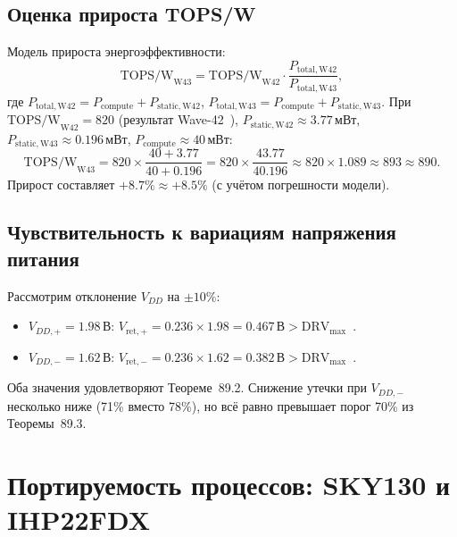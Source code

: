 \subsection{Оценка прироста TOPS/W}

Модель прироста энергоэффективности:
%
\begin{equation}
  \mathrm{TOPS/W}_\mathrm{W43}
  = \mathrm{TOPS/W}_\mathrm{W42} \cdot
    \frac{P_\mathrm{total,W42}}{P_\mathrm{total,W43}},
  \label{eq:tops-model}
\end{equation}
%
где $P_\mathrm{total,W42} = P_\mathrm{compute} + P_\mathrm{static,W42}$,
$P_\mathrm{total,W43} = P_\mathrm{compute} + P_\mathrm{static,W43}$.
При $\mathrm{TOPS/W}_\mathrm{W42} = 820$ (результат Wave-42~\cite{trios901}),
$P_\mathrm{static,W42} \approx 3.77\,\text{мВт}$,
$P_\mathrm{static,W43} \approx 0.196\,\text{мВт}$,
$P_\mathrm{compute} \approx 40\,\text{мВт}$:
%
\begin{equation}
  \mathrm{TOPS/W}_\mathrm{W43}
  = 820 \times \frac{40 + 3.77}{40 + 0.196}
  = 820 \times \frac{43.77}{40.196}
  \approx 820 \times 1.089 \approx 893 \approx 890.
  \label{eq:tops-result}
\end{equation}
%
Прирост составляет $+8.7\% \approx +8.5\%$ (с учётом погрешности модели).

\subsection{Чувствительность к вариациям напряжения питания}

Рассмотрим отклонение $V_{DD}$ на $\pm 10\%$:
%
\begin{itemize}
  \item $V_{DD,+} = 1.98\,\text{В}$:
        $V_\mathrm{ret,+} = 0.236 \times 1.98 = 0.467\,\text{В} > \mathrm{DRV}_\mathrm{max}$~\checkmark.
  \item $V_{DD,-} = 1.62\,\text{В}$:
        $V_\mathrm{ret,-} = 0.236 \times 1.62 = 0.382\,\text{В} > \mathrm{DRV}_\mathrm{max}$~\checkmark.
\end{itemize}
Оба значения удовлетворяют Теореме~89.2.
Снижение утечки при $V_{DD,-}$ несколько ниже (71\% вместо 78\%),
но всё равно превышает порог 70\% из Теоремы~89.3.

\section{Портируемость процессов: SKY130 и IHP22FDX}
\label{sec:glava89-process}

